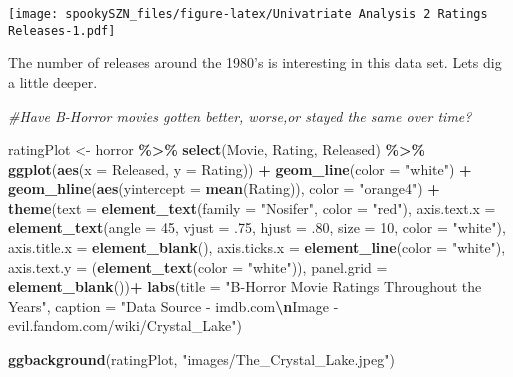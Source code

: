 \documentclass[
]{article}
\newenvironment{Shaded}{\begin{snugshade}}{\end{snugshade}}
\newcommand{\AttributeTok}[1]{\textcolor[rgb]{0.13,0.29,0.53}{#1}}
\newcommand{\CommentTok}[1]{\textcolor[rgb]{0.56,0.35,0.01}{\textit{#1}}}
\newcommand{\DecValTok}[1]{\textcolor[rgb]{0.00,0.00,0.81}{#1}}
\newcommand{\FunctionTok}[1]{\textcolor[rgb]{0.13,0.29,0.53}{\textbf{#1}}}
\newcommand{\NormalTok}[1]{#1}
\newcommand{\OtherTok}[1]{\textcolor[rgb]{0.56,0.35,0.01}{#1}}
\newcommand{\SpecialCharTok}[1]{\textcolor[rgb]{0.81,0.36,0.00}{\textbf{#1}}}
\newcommand{\StringTok}[1]{\textcolor[rgb]{0.31,0.60,0.02}{#1}}
\begin{document}
\texttt{[image: spookySZN\_files/figure-latex/Univatriate Analysis 2 Ratings Releases-1.pdf]}

The number of releases around the 1980's is interesting in this data
set. Lets dig a little deeper.

\begin{Shaded}
\begin{Highlighting}[]
\CommentTok{\#Have B{-}Horror movies gotten better, worse,or stayed the same over time? }

\NormalTok{ratingPlot }\OtherTok{\textless{}{-}}\NormalTok{ horror }\SpecialCharTok{\%\textgreater{}\%}
  \FunctionTok{select}\NormalTok{(Movie, Rating, Released) }\SpecialCharTok{\%\textgreater{}\%} 
  \FunctionTok{ggplot}\NormalTok{(}\FunctionTok{aes}\NormalTok{(}\AttributeTok{x =}\NormalTok{ Released, }\AttributeTok{y =}\NormalTok{ Rating)) }\SpecialCharTok{+} 
  \FunctionTok{geom\_line}\NormalTok{(}\AttributeTok{color =} \StringTok{"white"}\NormalTok{) }\SpecialCharTok{+}
  \FunctionTok{geom\_hline}\NormalTok{(}\FunctionTok{aes}\NormalTok{(}\AttributeTok{yintercept =} \FunctionTok{mean}\NormalTok{(Rating)), }\AttributeTok{color =} \StringTok{"orange4"}\NormalTok{) }\SpecialCharTok{+}
  \FunctionTok{theme}\NormalTok{(}\AttributeTok{text =} \FunctionTok{element\_text}\NormalTok{(}\AttributeTok{family =} \StringTok{"Nosifer"}\NormalTok{, }\AttributeTok{color =} \StringTok{"red"}\NormalTok{),}
    \AttributeTok{axis.text.x =} \FunctionTok{element\_text}\NormalTok{(}\AttributeTok{angle =} \DecValTok{45}\NormalTok{, }\AttributeTok{vjust =}\NormalTok{ .}\DecValTok{75}\NormalTok{, }\AttributeTok{hjust =}\NormalTok{ .}\DecValTok{80}\NormalTok{, }\AttributeTok{size =} \DecValTok{10}\NormalTok{, }\AttributeTok{color =} \StringTok{"white"}\NormalTok{),}
    \AttributeTok{axis.title.x =} \FunctionTok{element\_blank}\NormalTok{(),}
    \AttributeTok{axis.ticks.x =} \FunctionTok{element\_line}\NormalTok{(}\AttributeTok{color =} \StringTok{"white"}\NormalTok{),}
    \AttributeTok{axis.text.y =}\NormalTok{ (}\FunctionTok{element\_text}\NormalTok{(}\AttributeTok{color =} \StringTok{"white"}\NormalTok{)),}
    \AttributeTok{panel.grid =} \FunctionTok{element\_blank}\NormalTok{())}\SpecialCharTok{+}
  \FunctionTok{labs}\NormalTok{(}\AttributeTok{title =} \StringTok{"B{-}Horror Movie Ratings Throughout the Years"}\NormalTok{, }
       \AttributeTok{caption =} \StringTok{"Data Source {-} imdb.com}\SpecialCharTok{\textbackslash{}n}\StringTok{Image {-} evil.fandom.com/wiki/Crystal\_Lake"}\NormalTok{)}

\FunctionTok{ggbackground}\NormalTok{(ratingPlot, }\StringTok{"images/The\_Crystal\_Lake.jpeg"}\NormalTok{)}
\end{Highlighting}
\end{Shaded}
\end{document}
